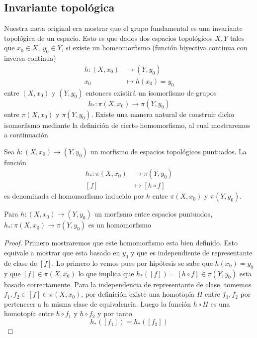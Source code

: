 {\subsection{Invariante topológica}
Nuestra meta original era mostrar que el grupo fundamental es una
invariante topológica de un espacio. Esto es que dados dos
espacios topológicos \(X,Y\) tales que \(x_0 \in X,\ y_0 \in Y\), si
existe un homeomorfismo (función biyectiva continua con inversa
continua)
\begin{align*}
  h : (X, x_0) &\longrightarrow (Y, y_0) \\
  x_0 &\longmapsto h(x_0) = y_0
\end{align*}
entre \((X, x_0)\) y \((Y, y_0)\) entonces existirá un isomorfismo de
grupos
\[ h_{*} : \pi (X, x_0) \longrightarrow \pi (Y, y_0) \]
entre \(\pi (X, x_0)\) y \(\pi (Y, y_0)\). Existe una manera natural de
construir dicho isomorfismo mediante la definición de cierto
homomorfismo, al cual mostraremos a continuación
\begin{definicion} \label{def:homomorfismo-inducido}
  Sea \(h : (X, x_0) \longrightarrow (Y, y_0)\) un morfismo de
  espacios topológicos puntuados. La función
  \begin{align*}
    h_* : \pi (X, x_0) &\longrightarrow \pi (Y, y_0) \\
    [f] &\longmapsto [h \circ f]
  \end{align*}
  es denominada el homomorfismo inducido por \(h\) entre \(\pi (X,
  x_0)\) y \(\pi (Y, y_0)\).
\end{definicion}
\begin{teorema} \label{thm:morfismo-homomorfismo}
  Para \(h : (X, x_0) \to (Y, y_0)\) un morfismo entre espacios
  puntuados, \(h_* : \pi (X, x_0) \to \pi (Y, y_0)\) es un homomorfismo
\end{teorema}
\begin{proof}
  Primero mostraremos que este homomorfismo esta bien definido. Esto
  equivale a mostrar que esta basado en \(y_0\) y que es
  independiente de representante de clase de \([f]\). Lo primero lo
  vemos pues por hipótesis se sabe que \(h
  (x_0) = y_0\) y que \([f] \in \pi (X, x_0)\) lo que implica que \(h_* ([f]) =
  [h \circ f] \in \pi (Y, y_0)\) esta basado correctamente. Para la
  independencia de representante de clase, tomemos \(f_1, f_2 \in [f]
  \in \pi (X, x_0)\), por definición existe una homotopía \(H\) entre
  \(f_1, f_2\) por pertenecer a la misma clase de equivalencia. Luego la
  función \(h \circ H\) es una homotopía entre \(h \circ f_1\) y \(h \circ
  f_2\) y  por tanto
  \[ h_* \left( [f_1] \right) = h_* \left( [ f_2 ] \right)\]


\end{proof}}
